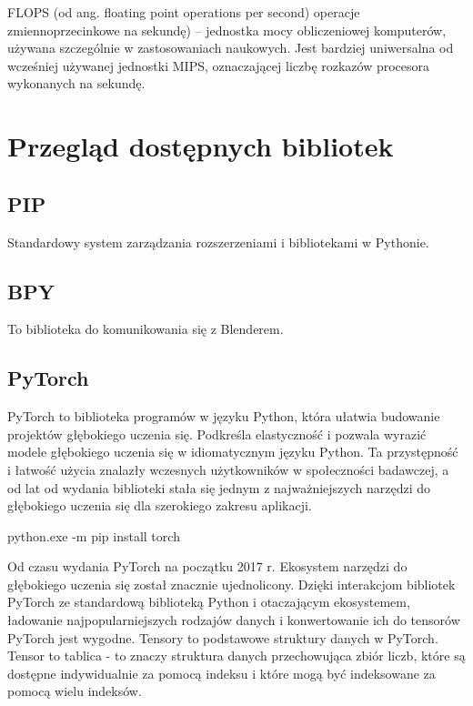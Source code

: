 \documentclass[brudnopis]{xmgr}
\begin{document}
FLOPS (od ang. floating point operations per second)  operacje zmiennoprzecinkowe na sekundę) – jednostka mocy obliczeniowej komputerów, używana szczególnie w zastosowaniach naukowych. Jest bardziej uniwersalna od wcześniej używanej jednostki MIPS, oznaczającej liczbę rozkazów procesora wykonanych na sekundę.


\chapter{Przegląd dostępnych bibliotek}


 \section{PIP\label{s:dsssl}}
 Standardowy system zarządzania rozszerzeniami i bibliotekami w Pythonie.
 
  \section{BPY\label{s:dsssl}}
  
  To biblioteka do komunikowania się z Blenderem.
  
    \section{PyTorch\label{s:dsssl}}
    
    
PyTorch to biblioteka programów w języku Python, która ułatwia budowanie projektów głębokiego uczenia się. Podkreśla elastyczność i pozwala wyrazić modele głębokiego uczenia się w idiomatycznym języku Python. Ta przystępność i łatwość użycia znalazły wczesnych użytkowników w społeczności badawczej, a od lat od wydania biblioteki stała się jednym z najważniejszych narzędzi do głębokiego uczenia się dla szerokiego zakresu aplikacji.

python.exe -m pip install torch

Od czasu wydania PyTorch na początku 2017 r. Ekosystem narzędzi do głębokiego uczenia się został znacznie ujednolicony.
Dzięki interakcjom bibliotek PyTorch ze standardową biblioteką Python i otaczającym ekosystemem, ładowanie najpopularniejszych rodzajów danych i konwertowanie ich do tensorów PyTorch jest wygodne.
Tensory to podstawowe struktury danych w PyTorch. Tensor to tablica - to znaczy struktura danych przechowująca zbiór liczb, które są dostępne indywidualnie za pomocą indeksu i które mogą być indeksowane za pomocą wielu indeksów.
\end{document}
